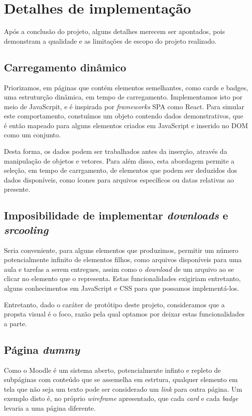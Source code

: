 \documentclass[11pt]{article}
\begin{document}
\section*{Detalhes de implementação}
\label{sec:orga4bf67f}
Após a conclusão do projeto, alguns detalhes merecem ser apontados,
pois demonstram a qualidade e as limitações de escopo do projeto
realizado.

\subsection*{Carregamento dinâmico}
\label{sec:org0be1379}
Priorizamos, em páginas que contém elementos semelhantes, como
cards e badges, uma estruturção dinâmica, em tempo de
carregamento. Implementamos isto por meio de JavaScrpit, e é
inspirada por \emph{frameworks} SPA como React. Para simular este
comportamento, constuímos um objeto contendo dados demonstrativos, que
é então mapeado para alguns elementos criados em JavaScript e inserido
no DOM como um conjunto.

Desta forma, os dados podem ser trabalhados antes da inserção, através
da manipulação de objetos e vetores. Para além disso, esta abordagem
permite a seleção, em tempo de carrgamento, de elementos que podem ser
deduzidos dos dados disponíveis, como ícones para arquivos específicos
ou datas relativas ao presente.

\subsection*{Imposibilidade de implementar \emph{downloads} e \emph{srcooling}}
\label{sec:org00aa07c}
Seria conveniente, para alguns elementos que produzimos, permitir um
número potencialmente infinito de elementos filhos, como arquivos
disponíveis para uma aula e tarefas a serem entregues, assim como o
\emph{download} de um arquivo ao se clicar no elemento que o representa.
Estas funcionalidades exigiriam entretanto, alguns conhecimentos em
JavaScript e CSS para que possamos implementá-los.

Entretanto, dado o caráter de protótipo deste projeto, consideramos
que a propsta visual é o foco, razão pela qual optamos por deixar
estas funcionalidades a parte.

\subsection*{Página \emph{dummy}}
\label{sec:org7d02422}
Como o Moodle é um sistema aberto, potencialmente infinto e repleto de
subpáginas com conteúdo que se assemelha em estrtura, qualquer
elemento em tela que não seja um texto pode ser considerado um \emph{link}
para outra página. Um exemplo disto é, no próprio \emph{wireframe}
apresentado, que cada \emph{card} e cada \emph{badge} levaria a uma página
diferente.
\end{document}
